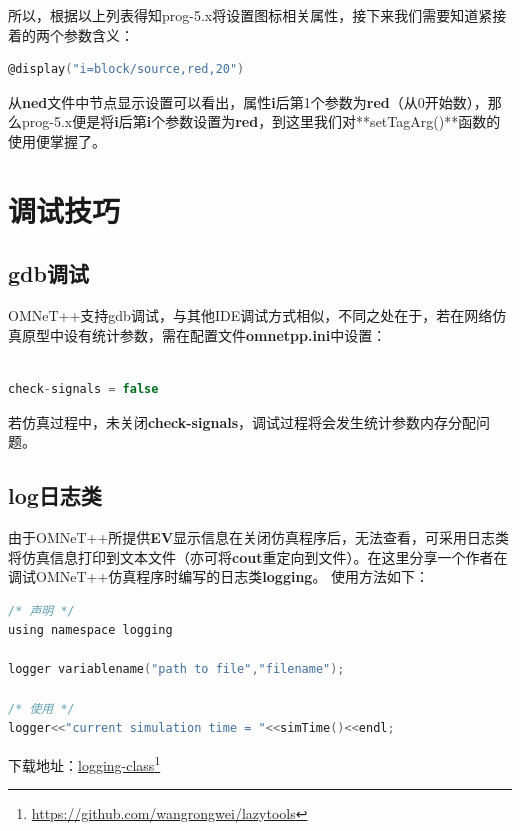 所以，根据以上列表得知prog-5.x将设置图标相关属性，接下来我们需要知道紧接着的两个参数含义：

\begin{lstlisting}[language=c]
@display("i=block/source,red,20")
\end{lstlisting}

从\textbf{ned}文件中节点显示设置可以看出，属性\textbf{i}后第1个参数为\textbf{red}（从0开始数），那么prog-5.x便是将\textbf{i}后第\textbf{i}个参数设置为\textbf{red}，到这里我们对**setTagArg()**函数的使用便掌握了。

\section{调试技巧}
\label{调试技巧}

\subsection{gdb调试}
\label{gdb调试}

OMNeT++支持gdb调试，与其他IDE调试方式相似，不同之处在于，若在网络仿真原型中设有统计参数，需在配置文件\textbf{omnetpp.ini}中设置：

\begin{lstlisting}[language=c]

check-signals = false

\end{lstlisting}

若仿真过程中，未关闭\textbf{check-signals}，调试过程将会发生统计参数内存分配问题。

\subsection{log日志类}
\label{log日志类}

由于OMNeT++所提供\textbf{EV}显示信息在关闭仿真程序后，无法查看，可采用日志类将仿真信息打印到文本文件（亦可将\textbf{cout}重定向到文件）。在这里分享一个作者在调试OMNeT++仿真程序时编写的日志类\textbf{logging}。
使用方法如下：

\begin{lstlisting}[language=c]
/* 声明 */
using namespace logging

logger variablename("path to file","filename"); 

/* 使用 */
logger<<"current simulation time = "<<simTime()<<endl;
\end{lstlisting}

下载地址：\href{https://github.com/wangrongwei/lazytools}{logging-class}\footnote{\href{https://github.com/wangrongwei/lazytools}{https:\slash \slash github.com\slash wangrongwei\slash lazytools}}

